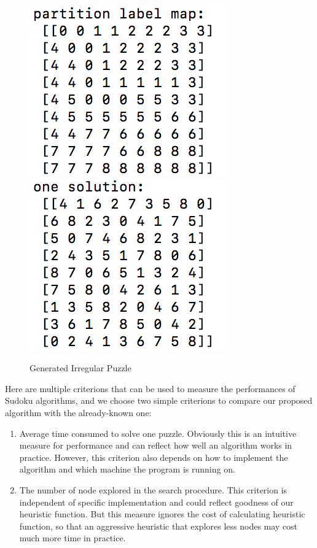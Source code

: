 \documentclass[12pt]{article}
\begin{document}
\begin{spacing}{1.1}
\begin{figure}[h!]
	\centering
	\includegraphics{pic5.png}
	\includegraphics{pic6.png}
	\caption{Generated Irregular Puzzle}
	\label{Fig:GenIrreg}
\end{figure}

Here are multiple criterions that can be used to measure the performances of Sudoku algorithms, and we choose two simple criterions to compare our proposed algorithm with the already-known one:
\begin{enumerate}
	\item Average time consumed to solve one puzzle. Obviously this is an intuitive measure for performance and can reflect how well an algorithm works in practice. However, this criterion also depends on how to implement the algorithm and which machine the program is running on.
	\item The number of node explored in the search procedure. This criterion is independent of specific implementation and could reflect goodness of our heuristic function. But this measure ignores the cost of calculating heuristic function, so that an aggressive heuristic that explores less nodes may cost much more time in practice.
\end{enumerate}


\end{spacing}
\end{document}
